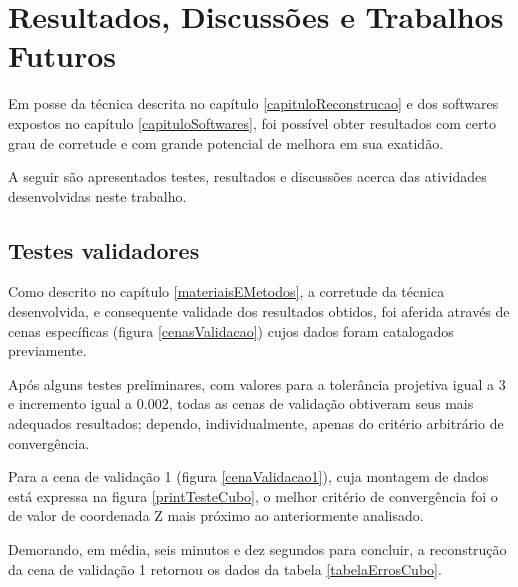 \chapter{Resultados, Discussões e Trabalhos Futuros}
	\label{capituloFinal}
	
	Em posse da técnica descrita no capítulo \ref{capituloReconstrucao} e dos softwares expostos no capítulo \ref{capituloSoftwares}, foi possível obter resultados com certo grau de corretude e com grande potencial de melhora em sua exatidão.
	
	A seguir são apresentados testes, resultados e discussões acerca das atividades desenvolvidas neste trabalho.
	
	\section{Testes validadores}
		\label{secaoTestes}
		
		Como descrito no capítulo \ref{materiaisEMetodos}, a corretude da técnica desenvolvida, e consequente validade dos resultados obtidos, foi aferida através de cenas específicas (figura \ref{cenasValidacao}) cujos dados foram catalogados previamente.
		
		Após alguns testes preliminares, com valores para a tolerância projetiva igual a $3$ e incremento igual a $0.002$, todas as cenas de validação obtiveram seus mais adequados resultados; dependo, individualmente, apenas do critério arbitrário de convergência.
		
		Para a cena de validação 1 (figura \ref{cenaValidacao1}), cuja montagem de dados está expressa na figura \ref{printTesteCubo}, o melhor critério de convergência foi o de valor de coordenada Z mais próximo ao anteriormente analisado.
		
		Demorando, em média, seis minutos e dez segundos para concluir, a reconstrução da cena de validação 1 retornou os dados da tabela \ref{tabelaErrosCubo}.
		

